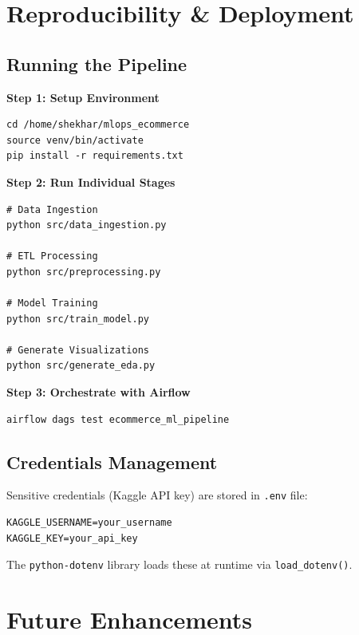 \documentclass[11pt,a4paper]{article}
\begin{document}
\section{Reproducibility \& Deployment}

\subsection{Running the Pipeline}

\textbf{Step 1: Setup Environment}
\begin{verbatim}
cd /home/shekhar/mlops_ecommerce
source venv/bin/activate
pip install -r requirements.txt
\end{verbatim}

\textbf{Step 2: Run Individual Stages}
\begin{verbatim}
# Data Ingestion
python src/data_ingestion.py

# ETL Processing
python src/preprocessing.py

# Model Training
python src/train_model.py

# Generate Visualizations
python src/generate_eda.py
\end{verbatim}

\textbf{Step 3: Orchestrate with Airflow}
\begin{verbatim}
airflow dags test ecommerce_ml_pipeline
\end{verbatim}

\subsection{Credentials Management}

Sensitive credentials (Kaggle API key) are stored in \texttt{.env} file:
\begin{verbatim}
KAGGLE_USERNAME=your_username
KAGGLE_KEY=your_api_key
\end{verbatim}

The \texttt{python-dotenv} library loads these at runtime via \texttt{load\_dotenv()}.

\section{Future Enhancements}
\end{document}
